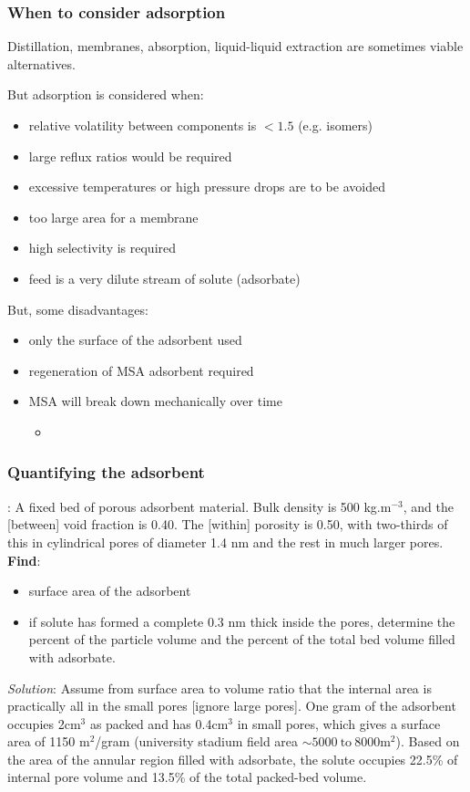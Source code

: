 \begin{frame}\frametitle{When to consider adsorption}
	Distillation, membranes, absorption, liquid-liquid extraction are sometimes viable alternatives. 
	
	\vspace{12pt}
	But adsorption is considered when:
	\begin{itemize}
		\item	relative volatility between components is $<1.5$ (e.g. isomers)
		\item	large reflux ratios would be required
		\item	excessive temperatures or high pressure drops are to be avoided
		\item	too large area for a membrane
		\item	high selectivity is required
		\item	feed is a very dilute stream of solute (adsorbate) 
	\end{itemize}
	But, some disadvantages:
	\begin{itemize}
		\item	only the surface of the adsorbent used
		\item	regeneration of MSA adsorbent required
		\item	MSA will break down mechanically over time
		\begin{itemize}
			\item	{\color{myOrange}{we can pump it, filter it, and/or put it through cyclones}}
		\end{itemize}
	\end{itemize}
\end{frame}

\begin{frame}\frametitle{Quantifying the adsorbent}
	: A fixed bed of porous adsorbent material. Bulk density is 500 kg.m$^{-3}$, and the {\color{purple}{interparticle}} [between] void fraction is 0.40. The {\color{purple}{intraparticle}} [within] porosity is 0.50, with two-thirds of this in cylindrical pores of diameter 1.4 nm and the rest in much larger pores. \textbf{Find}:
	\begin{itemize}
		\item	surface area of the adsorbent
		\item	if solute has formed a complete {\color{purple}{monomolecular layer}} 0.3 nm thick inside the pores, determine the percent of the particle volume and the percent of the total bed volume filled with adsorbate.
	\end{itemize}
	
	\vspace{12pt}
	\emph{Solution}:
	Assume from surface area to volume ratio that the internal area is practically all in the small pores [ignore large pores]. 
	One gram of the adsorbent occupies 2cm$^3$ as packed and has 0.4cm$^3$ in small pores, which gives a surface area of 1150 m$^2$/gram {\scriptsize (university stadium field area $\sim 5000~\text{to}~8000 \text{m}^2$)}. 
	Based on the area of the annular region filled with adsorbate, the solute occupies 22.5\% of internal pore volume and 13.5\% of the total packed-bed volume.	
\end{frame}

